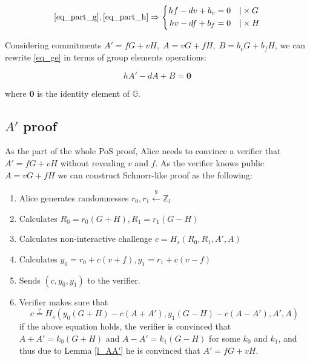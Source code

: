 \documentclass{article}
\numberwithin{figure}{section}
\begin{document}
\begin{equation} \label{eq_ge}
\eqref{eq_part_g}, \eqref{eq_part_h} \Rightarrow
\left\{ \begin{aligned} 
  h f - d v + b_v &= 0 \quad | \times G \\
  h v - d f + b_f &= 0 \quad | \times H
\end{aligned} \right.
\end{equation}

Considering commitments $A'=fG+vH, \; A=vG+fH, \; B=b_v G + b_f H$, we can rewrite \eqref{eq_ge} in terms of group elements operations: 

\begin{equation} 
    hA'-dA+B=\mathbf{0} \label{eq_ge_fin}
\end{equation}

where $\mathbf{0}$ is the identity element of $\mathbb{G}$.


\subsection{$A'$ proof} \label{a_prime_proof}

As the part of the whole PoS proof, Alice needs to convince a verifier that $A' = fG + vH$ without revealing $v$ and $f$. As the verifier knows public $A = vG + fH$ we can construct Schnorr-like proof as the following:

\begin{enumerate}
    \item Alice generates randomnesses $r_0, r_1 \stackrel{\$}{\leftarrow} \mathbb{Z}_l$ 
    
    \item Calculates $R_0 = r_0 (G + H), R_1 = r_1 (G - H)$
    
    \item Calculates non-interactive challenge $c = H_s(R_0, R_1, A', A)$
    
    \item Calculates $y_0 = r_0 + c(v+f), y_1 = r_1 + c(v-f)$
    
    \item Sends $(c, y_0, y_1)$ to the verifier.

    \item Verifier makes sure that
    \[ c \stackrel{?}{=} H_s(y_0(G+H)-c(A+A'), y_1(G-H)-c(A-A'), A', A)\]
    if the above equation holds, the verifier is convinced that $A+A'=k_0(G+H)$ and $A-A'=k_1(G-H)$ for some $k_0$ and $k_1$, and thus due to Lemma \ref{l_AA'} he is convinced that  $A' = fG + vH$.
\end{enumerate}
\end{document}
